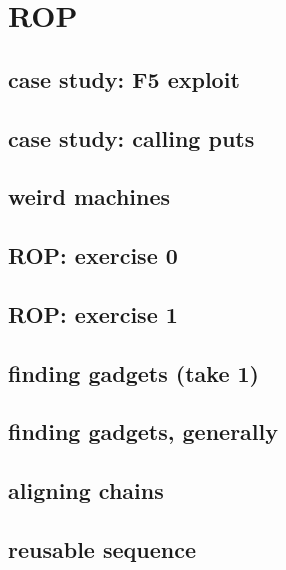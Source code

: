 
\section{ROP}


\subsection{case study: F5 exploit}


\subsection{case study: calling puts}


\subsection{weird machines}


\subsection{ROP: exercise 0}


\subsection{ROP: exercise 1}


\subsection{finding gadgets (take 1)}


\subsection{finding gadgets, generally}


\subsection{aligning chains}



\subsection{reusable sequence}


